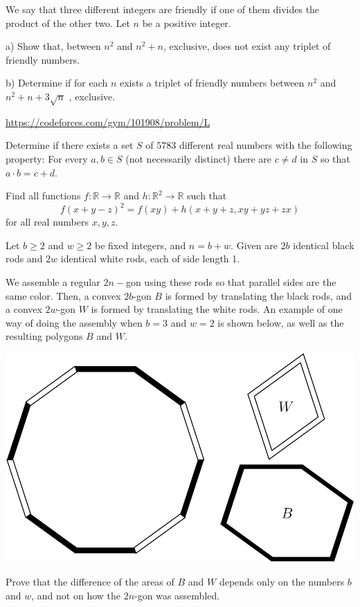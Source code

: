 \documentclass[11pt]{scrartcl}
\begin{document}
\begin{problem}
We say that three different integers are friendly if one of them divides the product of the other two. Let $n$ be a positive integer.

a) Show that, between $n^2$ and $n^2+n$, exclusive, does not exist any triplet of friendly numbers.

b) Determine if for each $n$ exists a triplet of friendly numbers between $n^2$ and $n^2+n+3\sqrt{n}$ , exclusive.
\end{problem}
\begin{problem}
\url{https://codeforces.com/gym/101908/problem/L}
\end{problem}
\begin{problem}[Israel 2023/6]
Determine if there exists a set $S$ of $5783$ different real numbers with the following property:
For every $a,b\in S$ (not necessarily distinct) there are $c\neq d$ in $S$ so that $a\cdot b=c+d$.
\end{problem}
\begin{problem}[Mongolia 2023/4]
Find all functions $f : \mathbb{R} \to \mathbb{R}$ and $h : \mathbb{R}^2 \to \mathbb{R}$ such that\[f(x+y-z)^2=f(xy)+h(x+y+z, xy+yz+zx)\]for all real numbers $x,y,z$.
\end{problem}
\begin{problem}[USAMO 2022/2]
    	Let $b\geq2$ and $w\geq2$ be fixed integers, and $n=b+w$. Given are $2b$ identical black rods and $2w$ identical white rods, each of side length 1.

We assemble a regular $2n-$gon using these rods so that parallel sides are the same color. Then, a convex $2b$-gon $B$ is formed by translating the black rods, and a convex $2w$-gon $W$ is formed by translating the white rods. An example of one way of doing the assembly when $b=3$ and $w=2$ is shown below, as well as the resulting polygons $B$ and $W$.

\begin{center}
\includegraphics[scale=0.5]{USAMO2022_2.png}
\end{center}
Prove that the difference of the areas of $B$ and $W$ depends only on the numbers $b$ and $w$, and not on how the $2n$-gon was assembled.
\end{problem}
\end{document}
